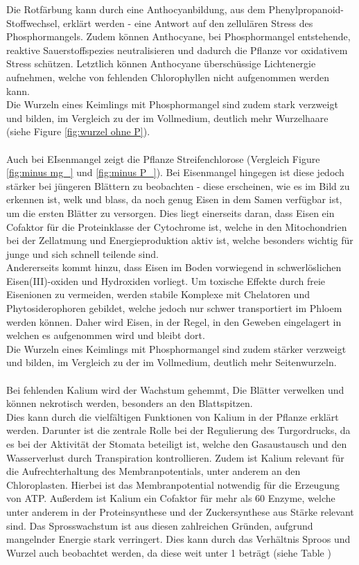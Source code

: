 \documentclass[10pt,a4paper]{article}
\begin{document}
	Die Rotfärbung kann durch eine Anthocyanbildung, aus dem Phenylpropanoid-Stoffwechsel, erklärt werden - eine Antwort auf den zellulären Stress des Phosphormangels. Zudem können Anthocyane, bei Phosphormangel entstehende, reaktive Sauerstoffspezies neutralisieren und dadurch die Pflanze vor oxidativem Stress schützen. Letztlich können Anthocyane überschüssige Lichtenergie aufnehmen, welche von fehlenden Chlorophyllen nicht aufgenommen werden kann.\\
	Die Wurzeln eines Keimlings mit Phosphormangel sind zudem stark verzweigt und bilden, im Vergleich zu der im Vollmedium, deutlich mehr Wurzelhaare (siehe Figure \ref{fig:wurzel ohne P}).\\
	\\
	Auch bei EIsenmangel zeigt die Pflanze Streifenchlorose (Vergleich Figure \ref{fig:minus mg_} und \ref{fig:minus P_}). Bei Eisenmangel hingegen ist diese jedoch stärker bei jüngeren Blättern zu beobachten - diese erscheinen, wie es im Bild zu erkennen ist, welk und blass, da noch genug Eisen in dem Samen verfügbar ist, um die ersten Blätter zu versorgen.
	Dies liegt einerseits daran, dass Eisen ein Cofaktor für die Proteinklasse der Cytochrome ist, welche in den Mitochondrien bei der Zellatmung und Energieproduktion aktiv ist, welche besonders wichtig für junge und sich schnell teilende sind. \\
	Andererseits kommt hinzu, dass Eisen im Boden vorwiegend in schwerlöslichen Eisen(III)-oxiden und Hydroxiden vorliegt. Um toxische Effekte durch freie Eisenionen zu vermeiden, werden stabile Komplexe mit Chelatoren und Phytosiderophoren gebildet, welche jedoch nur schwer transportiert im Phloem werden können. Daher wird Eisen, in der Regel, in den Geweben eingelagert in welchen es aufgenommen wird und bleibt dort. \\
	Die Wurzeln eines Keimlings mit Phosphormangel sind zudem stärker verzweigt und bilden, im Vergleich zu der im Vollmedium, deutlich mehr Seitenwurzeln.\\
	\\
	Bei fehlenden Kalium wird der Wachstum gehemmt, Die Blätter verwelken und können nekrotisch werden, besonders an den Blattspitzen. \\
	Dies kann durch die vielfältigen Funktionen von Kalium in der Pflanze erklärt werden. Darunter ist die zentrale Rolle bei der Regulierung des Turgordrucks, da es bei der Aktivität der Stomata beteiligt ist, welche den Gasaustausch und den Wasserverlust durch Transpiration kontrollieren. Zudem ist Kalium relevant für die Aufrechterhaltung des Membranpotentials, unter anderem an den Chloroplasten. Hierbei ist das Membranpotential notwendig für die Erzeugung von ATP. Außerdem ist Kalium ein Cofaktor für mehr als 60 Enzyme, welche unter anderem in der Proteinsynthese und der Zuckersynthese aus Stärke relevant sind. Das Sprosswachstum ist aus diesen zahlreichen Gründen, aufgrund mangelnder Energie stark verringert. Dies kann durch das Verhältnis Sproos und Wurzel auch beobachtet werden, da diese weit unter 1 beträgt (siehe Table )\\
\end{document}
